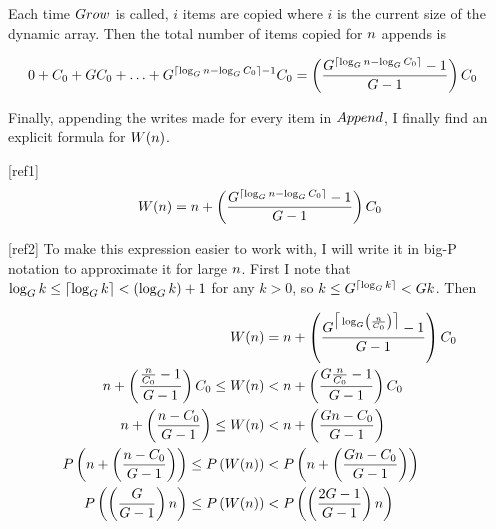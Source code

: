 Each time $Grow$ is called, $i$ items are copied where $i$ is the current size of the dynamic array. Then the total number of items copied for $n$ appends is

\begin{align*}
0 + C_0 + GC_0 + \ldots + G^{\lceil \log_{G} n - \log_{G} C_0 \rceil - 1}C_0 &= \left( \frac{G^{\lceil \log_{G} n - \log_{G} C_0 \rceil} - 1}{G - 1} \right) C_0
\end{align*}

Finally, appending the writes made for every item in $Append$, I finally find an explicit formula for $W(n)$.

[ref1]
$$
W(n) = n + \left( \frac{G^{\lceil \log_{G} n - \log_{G} C_0 \rceil} - 1}{G - 1} \right) C_0
$$

[ref2]
To make this expression easier to work with, I will write it in big-P notation to approximate it for large $n$. First I note that $\log_{G} k \leq \lceil \log_{G} k \rceil < \left( \log_{G} k \right) + 1$ for any $k > 0$, so $k \leq G^{\lceil \log_{G} k \rceil} < G{k}$. Then

\begin{align*}
W(n) &= n + \left( \frac{G^{\big\lceil \log_{G} \left( \frac {n} {C_0} \right) \big\rceil} - 1}{G - 1} \right) C_0\\
n + \left( \frac{\frac{n}{C_0} - 1}{G - 1} \right) C_0 \leq W(n) &< n + \left( \frac{G\frac{n}{C_0} - 1}{G - 1} \right) C_0\\
n + \left( \frac{n - C_0}{G - 1} \right) \leq W(n) &< n + \left( \frac{Gn - C_0}{G - 1} \right)\\
P\left( n + \left( \frac{n - C_0}{G - 1} \right) \right) \leq P\left( W(n) \right) &< P\left( n + \left( \frac{Gn - C_0}{G - 1} \right) \right)\\
P\left( \left( \frac{G}{G - 1} \right) n \right) \leq P\left( W(n) \right) &< P\left( \left( \frac{2G - 1}{G - 1} \right) n \right)
\end{align*}

